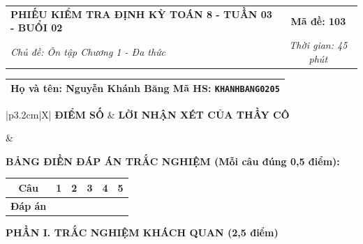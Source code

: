 \documentclass[12pt,a4paper]{article}
\begin{document}
\newpage


\noindent
\begin{tabularx}{\linewidth}{|X|c|}
\hline
\textbf{PHIẾU KIỂM TRA ĐỊNH KỲ TOÁN 8 - TUẦN 03 - BUỔI 02} & \textbf{Mã đề: 103} \\
\textit{Chủ đề: Ôn tập Chương 1 - Đa thức} & \textit{Thời gian: 45 phút} \\
\hline
\end{tabularx}

\vspace{1mm}

\noindent
\begin{tabularx}{\linewidth}{|X|}
\hline
\rule[-2mm]{0pt}{7.5mm}\textbf{Họ và tên:} \textbf{\large Nguyễn Khánh Băng} \hfill \textbf{Mã HS:} \texttt{KHANHBANG0205} \quad \\
\hline
\end{tabularx}

\vspace{1mm}

\noindent
\begin{tabularx}{\linewidth}{|p{3.2cm}|X|}
\hline
\centering\textbf{ĐIỂM SỐ} & \centering\textbf{LỜI NHẬN XÉT CỦA THẦY CÔ} \tabularnewline
\hline
\rule{0pt}{1.3cm} & \tabularnewline
\hline
\end{tabularx}

\vspace{1.2mm}

\noindent\textbf{BẢNG ĐIỀN ĐÁP ÁN TRẮC NGHIỆM (Mỗi câu đúng 0,5 điểm):}
\vspace{0.8mm}

\noindent
\renewcommand{\arraystretch}{1.35}
\begin{tabularx}{\linewidth}{|c|*{5}{>{\centering\arraybackslash}X|}}
\hline
\textbf{Câu} & \textbf{1} & \textbf{2} & \textbf{3} & \textbf{4} & \textbf{5} \\
\hline
\textbf{Đáp án} & & & & & \\
\hline
\end{tabularx}
\renewcommand{\arraystretch}{1.0}

\vspace{1.5mm}

\noindent\textbf{\large PHẦN I. TRẮC NGHIỆM KHÁCH QUAN (2,5 điểm)}
\vspace{1mm}
\end{document}
